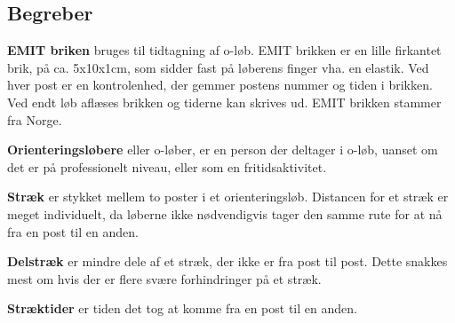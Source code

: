 \subsection{Begreber}

\textbf{EMIT briken} bruges til tidtagning af o-løb. EMIT brikken er en lille firkantet brik, på ca. 5x10x1cm, som sidder fast på løberens finger vha. en elastik. Ved hver post er en kontrolenhed, der gemmer postens nummer og tiden i brikken. Ved endt løb aflæses brikken og tiderne kan skrives ud. EMIT brikken stammer fra Norge.

\textbf{Orienteringsløbere} eller o-løber, er en person der deltager i o-løb, uanset om det er på professionelt niveau, eller som en fritidsaktivitet.

\textbf{Stræk} er stykket mellem to poster i et orienteringsløb. Distancen for et stræk er meget individuelt, da løberne ikke nødvendigvis tager den samme rute for at nå fra en post til en anden.

\textbf{Delstræk} er mindre dele af et stræk, der ikke er fra post til post. Dette snakkes mest om hvis der er flere svære forhindringer på et stræk.

\textbf{Stræktider} er tiden det tog at komme fra en post til en anden.



